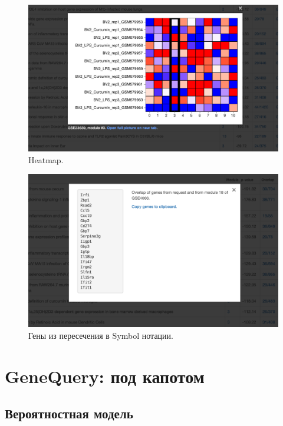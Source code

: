\documentclass[10pt,pdf,utf8,russian,aspectratio=169]{beamer}
\begin{document}
\begin{frame}
    \begin{figure}[p]
        \centering
        \caption{Heatmap.}
        \includegraphics[height=0.9\textheight]{./img/screen_heat.png}
    \end{figure}
\end{frame}

\begin{frame}
    \begin{figure}[p]
        \centering
        \caption{Гены из пересечения в Symbol нотации.}
        \includegraphics[height=0.9\textheight]{./img/screen_overlap.png}
    \end{figure}
\end{frame}


\section{GeneQuery: под капотом}

\subsection{Вероятностная модель}
\end{document}
